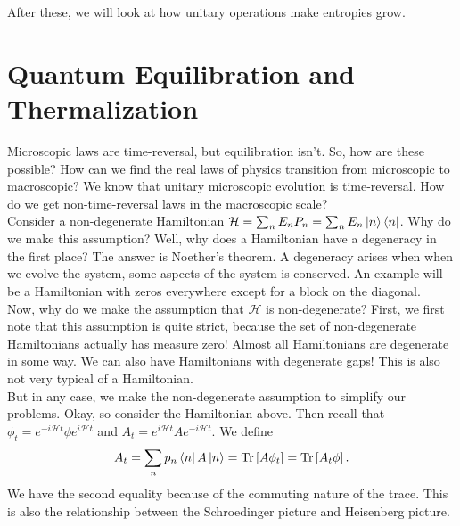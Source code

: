 \documentclass{book}
\theoremstyle{definition}
\newcommand{\had}{\mathcal{H}}
\newcommand{\lb}{\left[}
\newcommand{\rb}{\right]}
\begin{document}
After these, we will look at how unitary operations make entropies grow. 




   
   
   










\newpage


\section{Quantum Equilibration and Thermalization}

Microscopic laws are time-reversal, but equilibration isn't. So, how are these possible? How can we find the real laws of physics transition from microscopic to macroscopic? We know that unitary microscopic evolution is time-reversal. How do we get non-time-reversal laws in the macroscopic scale? \\

Consider a non-degenerate Hamiltonian $\had = \sum_n E_n P_n = \sum_n E_n \ket{n}\bra{n}$. Why do we make this assumption? Well, why does a Hamiltonian have a degeneracy in the first place? The answer is Noether's theorem. A degeneracy arises when when we evolve the system, some aspects of the system is conserved. An example will be a Hamiltonian with zeros everywhere except for a block on the diagonal. \\

Now, why do we make the assumption that $\had$ is non-degenerate? First, we first note that this assumption is quite strict, because the set of non-degenerate Hamiltonians actually has measure zero! Almost all Hamiltonians are degenerate in some way. We can also have Hamiltonians with degenerate gaps! This is also not very typical of a Hamiltonian. \\

But in any case, we make the non-degenerate assumption to simplify our problems. Okay, so consider the Hamiltonian above. Then recall that $\phi_t = e^{-i\had t}\phi e^{i\had t}$ and $A_t = e^{i\had t}A e^{-i\had t}$. We define
\begin{align}
A_t = \sum_n p_n \bra{n}A \ket{n}  =\Tr\lb A \phi_t \rb = \Tr \lb A_t \phi \rb.
\end{align}
We have the second equality because of the commuting nature of the trace. This is also the relationship between the Schroedinger picture and Heisenberg picture. 
\end{document}
